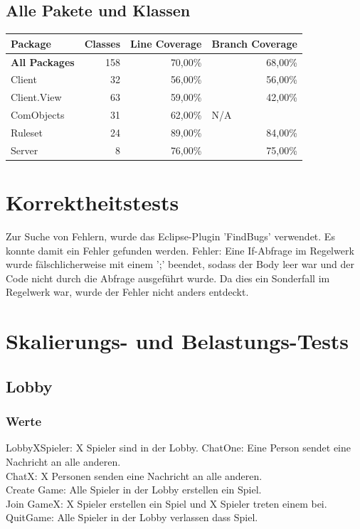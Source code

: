 \documentclass[a4paper]{article}
\begin{document}
	
	\subsection{Alle Pakete und Klassen}

	\noindent	
\begin{tabular}{|l|r|r|r|}
\hline
Package & \multicolumn{1}{l|}{Classes} & \multicolumn{1}{l|}{Line Coverage} & \multicolumn{1}{l|}{Branch Coverage} \\ \hline \hline
\textbf{All Packages} & 158 & 70,00\% & 68,00\% \\ \hline 
Client & 32 & 56,00\% & 56,00\% \\ \hline
Client.View & 63 & 59,00\% & 42,00\% \\ \hline
ComObjects & 31 & 62,00\% & \multicolumn{1}{l|}{N/A} \\ \hline
Ruleset & 24 & 89,00\% & 84,00\% \\ \hline
Server & 8 & 76,00\% & 75,00\% \\ \hline
\end{tabular}

	
	
\section{Korrektheitstests}
Zur Suche von Fehlern, wurde das Eclipse-Plugin 'FindBugs' verwendet. Es konnte damit ein Fehler gefunden werden.
Fehler: Eine If-Abfrage im Regelwerk wurde fälschlicherweise mit einem ';' beendet, sodass der Body leer war und der Code nicht durch die Abfrage ausgeführt wurde. Da dies ein Sonderfall im Regelwerk war, wurde der Fehler nicht anders entdeckt.


\section{Skalierungs- und Belastungs-Tests}
\subsection{Lobby}
\subsubsection{Werte}
LobbyXSpieler: X Spieler sind in der Lobby.
ChatOne: Eine Person sendet eine Nachricht an alle anderen. \\
ChatX: X Personen senden eine Nachricht an alle anderen. \\
Create Game: Alle Spieler in der Lobby erstellen ein Spiel. \\
Join GameX: X Spieler erstellen ein Spiel und X Spieler treten einem bei. \\ 
QuitGame: Alle Spieler in der Lobby verlassen dass Spiel. \\
\end{document}
